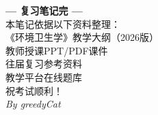 \newpage

\vspace*{3cm}
\begin{center}
    {\Large\color{main}\textbf{--- 复习笔记完 ---}}\\[20pt]
    {\normalsize\color{gray!70}
    本笔记依据以下资料整理：\\[5pt]
    《环境卫生学》教学大纲（2026版）\\
    教师授课PPT/PDF课件\\
    往届复习参考资料\\
    教学平台在线题库\\
    \vspace{20pt}
    祝考试顺利！\\[20pt]
    \textit{By greedyCat}
    }
\end{center}


\newpage